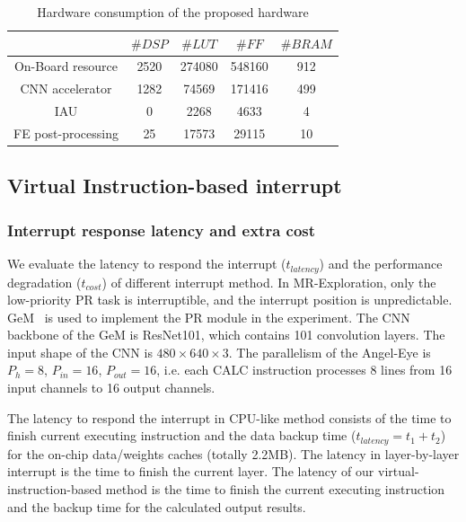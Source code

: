 \begin{table}[t]
 \centering
 \caption{Hardware consumption of the proposed hardware}
\begin{tabular}{|c|c|c|c|c|}
 \hline
 & $\# DSP$ & $\# LUT$ & $\# FF$ & $\# BRAM$ \\
 \hline
 On-Board resource & 2520 & 274080 & 548160 & 912 \\
 \hline
 CNN accelerator & 1282 & 74569 & 171416 & 499 \\
 \hline
 IAU & 0 & 2268 & 4633 & 4 \\
 \hline
 FE post-processing & 25 & 17573 & 29115 & 10 \\
 \hline
 \end{tabular}%
 
 \label{tab:hardware}%
\end{table}%


\subsection{Virtual Instruction-based interrupt }
\label{sec:exptlatency}

\subsubsection{ Interrupt response latency and extra cost}

We evaluate the latency to respond the interrupt ($t_{latency}$) and the performance degradation ($t_{cost}$) of different interrupt method. In MR-Exploration, only the low-priority PR task is interruptible, and the interrupt position is unpredictable. GeM~\cite{radenovic2018fine} is used to implement the PR module in the experiment.
The CNN backbone of the GeM is ResNet101, which contains 101 convolution layers. The input shape of the CNN is $480 \times 640 \times 3$. The parallelism of the Angel-Eye is $P_{h}=8$, $P_{in}=16$, $P_{out}=16$, i.e. each CALC instruction processes 8 lines from 16 input channels to 16 output channels. 

The latency to respond the interrupt in CPU-like method consists of the time to finish current executing instruction and the data backup time ($t_{latency} = t_1+t_2$) for the on-chip data/weights caches (totally 2.2MB). The latency in layer-by-layer interrupt is the time to finish the current layer. The latency of our virtual-instruction-based method is the time to finish the current executing instruction and the backup time for the calculated output results. 

